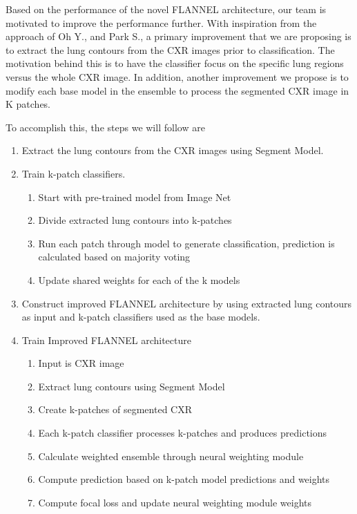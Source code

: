 \documentclass{sigkddExp}
\begin{document}
Based on the performance of the novel FLANNEL architecture, our team is
motivated to improve the performance further. With inspiration from the approach
of Oh Y., and Park S., a primary improvement that we are proposing is to extract
the lung contours from the CXR images prior to classification. The motivation
behind this is to have the classifier focus on the specific lung regions versus
the whole CXR image. In addition, another improvement we propose is to modify
each base model in the ensemble to process the segmented CXR image in K patches.

To accomplish this, the steps we will follow are

\begin{enumerate}
    \item Extract the lung contours from the CXR images using Segment Model.
    \item Train k-patch classifiers.
          \begin{enumerate}
              \item Start with pre-trained model from Image Net
              \item Divide extracted lung contours into k-patches
              \item Run each patch through model to generate classification,
                    prediction is calculated based on majority voting
              \item Update shared weights for each of the k models
          \end{enumerate}
    \item Construct improved FLANNEL architecture by using extracted lung
          contours as input and k-patch classifiers used as the base models.
    \item Train Improved FLANNEL architecture
          \begin{enumerate}
              \item Input is CXR image
              \item Extract lung contours using Segment Model
              \item Create k-patches of segmented CXR
              \item Each k-patch classifier processes k-patches and produces predictions
              \item Calculate weighted ensemble through neural weighting module
              \item Compute prediction based on k-patch model predictions and weights
              \item Compute focal loss and update neural weighting module weights

\end{enumerate}
\end{enumerate}
\end{document}
